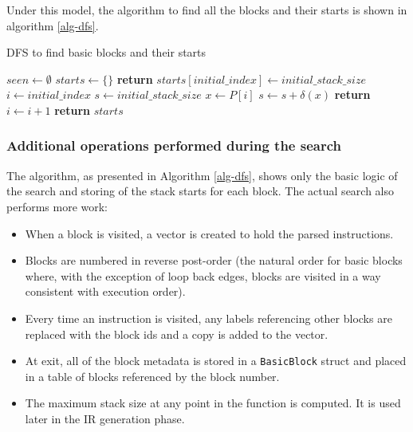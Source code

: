 Under this model, the algorithm to find all the blocks and their starts is shown in algorithm
\ref{alg-dfs}.

\begin{algorithm}[t]
      \caption{DFS to find basic blocks and their starts}\label{alg-dfs}
      \begin{algorithmic}[1]
            \State $seen \gets \emptyset$
            \State $starts \gets \{\}$
            \State \textbf{return}
            \EndIf
            \State $starts[initial\_index] \gets initial\_stack\_size$
            \State $i \gets initial\_index$
            \State $s \gets initial\_stack\_size$
            \Repeat
            \State $x \gets P[i]$
            \State $s \gets s + \delta(x)$
            \State {}
            \EndFor
            \State {}
            \EndIf
            \State \textbf{return}
            \EndIf
            \State $i \gets i + 1$
            \EndFunction
            \State {}
            \State \textbf{return} $starts$
            \EndFunction
      \end{algorithmic}
\end{algorithm}

\subsubsection{Additional operations performed during the search} \label{addop}

The algorithm, as presented in Algorithm \ref{alg-dfs}, shows only the basic logic of the search
and
storing of the stack starts for each block. The actual search also performs more work:

\begin{itemize}
      \item When a block is visited, a vector is created to hold the parsed instructions.
      \item Blocks are numbered in reverse post-order (the natural order for basic blocks where,
            with the exception of loop back edges, blocks are visited in a way consistent with
            execution order).
      \item Every time an instruction is visited, any labels referencing other blocks are replaced
            with the block ids and a copy is added to the vector.
      \item At exit, all of the block metadata is stored in a \texttt{BasicBlock} struct and placed
            in a table of blocks referenced by the block number.
      \item The maximum stack size at any point in the function is computed. It is used later in
            the IR generation phase.
\end{itemize}

